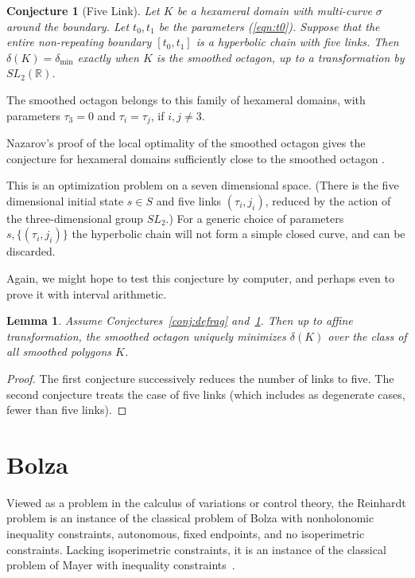 \documentclass[11pt]{amsart}
\newtheorem{lemma}[equation]{Lemma}
\newtheorem{conj}[equation]{Conjecture}
\newcommand{\ring}[1]{\mathbb{#1}}
\def\deltalat{\mathbb\delta}  %
\def\delt{\delta_{\min}}
\def\rR{{\ring{R}}}
\def\ta{{\tau}}
\begin{document}
\begin{conj}[Five Link]\label{conj:5} 
  Let $K$ be a hexameral domain with multi-curve $\sigma$ around the
  boundary.  Let $t_0,t_1$ be the parameters (\ref{eqn:t0}).  Suppose
  that the entire non-repeating boundary $[t_0,t_1]$ is a hyperbolic
  chain with five links.  Then $\deltalat(K)= \delt$ exactly when $K$
  is the smoothed octagon, up to a transformation by $SL_2(\rR)$.
\end{conj}

The smoothed octagon belongs to this family of hexameral
domains, with parameters $\ta_3=0$ and $\ta_i=\ta_j$, if $i,j\ne 3$.

Nazarov's proof of the local optimality of the smoothed octagon
gives the conjecture for hexameral domains sufficiently close
to the smoothed octagon \cite{Nazarov}.

This is an optimization problem on a seven dimensional space.  (There
is the five dimensional initial state $s\in S$ and five links
$(\ta_i,j_i)$, reduced by the action of the three-dimensional group
$SL_2$.)  For a generic choice of parameters $s,\{(\ta_i,j_i)\}$ the
hyperbolic chain will not form a simple closed curve, and can be
discarded.

Again, we might hope to test this conjecture by computer, and perhaps
even to prove it with interval arithmetic.

\begin{lemma}\label{lemma:smooth}  
  Assume Conjectures~\ref{conj:defrag} and~\ref{conj:5}.  Then up to
  affine transformation, the smoothed octagon uniquely minimizes
  $\deltalat(K)$ over the class of all smoothed polygons $K$.
\end{lemma}

\begin{proof} The first conjecture successively reduces the number of links to
  five.  The second conjecture treats the case of five links (which
  includes as degenerate cases, fewer than five links).
\end{proof}


\section{Bolza}


Viewed as a problem in the calculus of variations or control theory,
the Reinhardt problem is an instance of the classical problem of Bolza
with nonholonomic inequality constraints, autonomous, fixed endpoints,
and no isoperimetric constraints.  Lacking isoperimetric constraints,
it is an instance of the classical problem of Mayer with inequality
constraints~\cite[Ch.7]{Hestenes:1966}.
\end{document}
